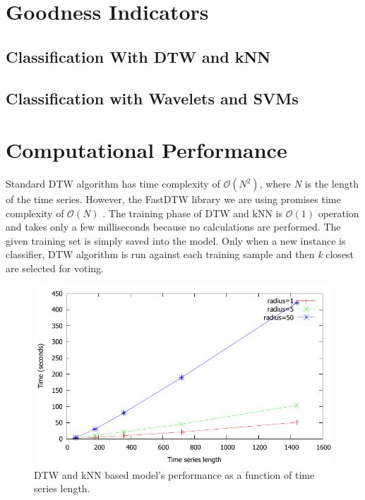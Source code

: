 


\section{Goodness Indicators}
\subsection{Classification With DTW and kNN}


\subsection{Classification with Wavelets and SVMs}


\section{Computational Performance}
Standard DTW algorithm has time complexity of $\mathcal{O}(N^2)$, where \emph{N} is the length of the time series. However, the FastDTW library we are using promises time complexity of $\mathcal{O} (N)$ \cite{salvador04}. The training phase of DTW and kNN is $\mathcal{O}(1)$ operation and takes only a few milliseconds because no calculations are performed. The given training set is simply saved into the model. Only when a new instance is classifier, DTW algorithm is run against each training sample and then \emph{k} closest are selected for voting.

\begin{center}
\begin{figure}[h!]
\includegraphics[scale=0.7]{images/dtw_knn_performance_timeseries_length.pdf}
\caption{DTW and kNN based model's performance as a function of time series length.}
\label{fig:dtw_knn_performance_timeseries_length}
\end{figure}
\end{center}

